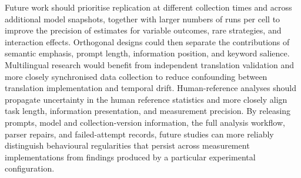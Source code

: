 \documentclass[logo,msc]{infthesis}
\begin{document}
Future work should prioritise replication at different collection times and across additional model snapshots, together with larger numbers of runs per cell to improve the precision of estimates for variable outcomes, rare strategies, and interaction effects. Orthogonal designs could then separate the contributions of semantic emphasis, prompt length, information position, and keyword salience. Multilingual research would benefit from independent translation validation and more closely synchronised data collection to reduce confounding between translation implementation and temporal drift. Human-reference analyses should propagate uncertainty in the human reference statistics and more closely align task length, information presentation, and measurement precision. By releasing prompts, model and collection-version information, the full analysis workflow, parser repairs, and failed-attempt records, future studies can more reliably distinguish behavioural regularities that persist across measurement implementations from findings produced by a particular experimental configuration.



\end{document}
